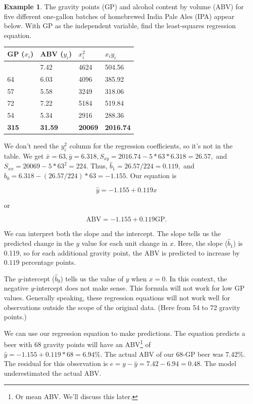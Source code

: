 \documentclass[
]{book}
\theoremstyle{definition}
\theoremstyle{definition}
\newtheorem{example}{Example}[chapter]
\theoremstyle{definition}
\theoremstyle{definition}
\theoremstyle{remark}
\begin{document}
\begin{examplebox}

\begin{example}
\protect\hypertarget{exm:gravity}{}\label{exm:gravity}The gravity points (GP)\autocite{GP} and alcohol content by volume (ABV) for five different one-gallon batches of homebrewed India Pale Ales (IPA) appear below. With GP as the independent variable, find the least-squares regression equation.

\begin{longtable}[]{@{}llll@{}}
\toprule\noalign{}
GP (\(x_i\)) & ABV (\(y_i\)) & \(x_i^2\) & \(x_i y_i\) \\
\midrule\noalign{}
\endhead
\bottomrule\noalign{}
\endlastfoot
68 & 7.42 & 4624 & 504.56 \\
64 & 6.03 & 4096 & 385.92 \\
57 & 5.58 & 3249 & 318.06 \\
72 & 7.22 & 5184 & 519.84 \\
54 & 5.34 & 2916 & 288.36 \\
\textbf{315} & \textbf{31.59} & \textbf{20069} & \textbf{2016.74} \\
\end{longtable}

We don't need the \(y_i^2\) column for the regression coefficients, so it's not in the table. We get \(\bar{x}=63,\bar{y}=6.318,S_{xy}=2016.74-5*63*6.318=26.57,\) and \(S_{xx}=20069-5*63^2=224.\) Thus, \(\hat{b}_1=26.57/224=0.119,\) and \(\hat{b}_0=6.318-(26.57/224)*63=-1.155.\) Our equation is

\[\hat{y}=-1.155+0.119x\]

or

\[\text{ABV}=-1.155+0.119\text{GP}.\]

We can interpret both the slope and the intercept. The slope tells us the predicted change in the \(y\) value for each unit change in \(x.\) Here, the slope (\(\hat{b}_1\)) is 0.119, so for each additional gravity point, the ABV is predicted to increase by \(0.119\) percentage points.

The \(y\)-intercept (\(\hat{b}_0\)) tells us the value of \(y\) when \(x=0.\) In this context, the negative \(y\)-intercept does not make sense. This formula will not work for low GP values. Generally speaking, these regression equations will not work well for observations outside the scope of the original data. (Here from 54 to 72 gravity points.)

We can use our regression equation to make predictions. The equation predicts a beer with 68 gravity points will have an ABV\footnote{Or mean ABV. We'll discuss this later.} of \(\hat{y}=-1.155+0.119*68=6.94\%.\) The actual ABV of our 68-GP beer was 7.42\%. The residual for this observation is \(e=y-\hat{y}=7.42-6.94=0.48.\) The model underestimated the actual ABV.
\end{example}

\end{examplebox}
\end{document}
